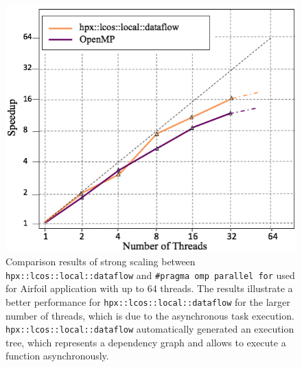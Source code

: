 \documentclass[conference]{IEEEtran}
\begin{document}
\begin{figure} 
\begin{center}
\centering
\includegraphics[width=1\columnwidth]{Pictures/dataflow.jpg}
\caption {\small{Comparison results of strong scaling between \texttt{hpx::lcos::local::dataflow} and \texttt{\#pragma omp parallel for} used for Airfoil application
with up to 64 threads. The results illustrate a better performance for \texttt{hpx::lcos::local::dataflow} for the larger number of threads, which is due to the asynchronous task execution. \texttt{hpx::lcos::local::dataflow} automatically generated an execution tree, which represents a dependency graph and allows to execute a function asynchronously. }}
\label{f2}
\end{center}
\end{figure}
 
\end{document}
